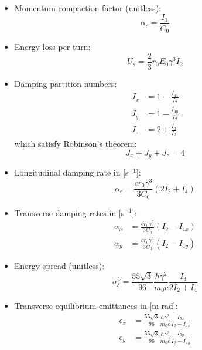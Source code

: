 \begin{itemize}
    \item Momentum compaction factor (unitless):
    \begin{equation}
        \alpha_c = \frac{I_1}{C_0}
    \end{equation}

    \item Energy loss per turn:
    \begin{equation}
        U_s = \frac{2}{3} r_0 E_0 \gamma^3 I_2
    \end{equation}

    \item Damping partition numbers:
    \begin{align}
        J_x &= 1 - \frac{I_{4x}}{I_2}\\
        J_y &= 1 - \frac{I_{4y}}{I_2}\\
        J_z &= 2 + \frac{I_4}{I_2}
    \end{align}
    which satisfy Robinson's theorem:
    \begin{equation}
        J_x + J_y + J_z = 4
    \end{equation}

    \item Longitudinal damping rate in [s$^{-1}$]:
    \begin{equation}
        \alpha_\epsilon = \frac{c r_0 \gamma^3}{3 C_0} (2I_2 + I_4)
    \end{equation}

    \item Transverse damping rates in [s$^{-1}$]:
    \begin{align}
        \alpha_x &= \frac{c r_0 \gamma^3}{3C_0} (I_2 - I_{4x})\\
        \alpha_y &= \frac{c r_0 \gamma^3}{3C_0} (I_2 - I_{4y})
    \end{align}

    \item Energy spread (unitless):
    \begin{equation}
        \sigma_\delta^2 = \frac{55 \sqrt{3}}{96} \frac{\hbar \gamma^2}{m_0 c} \frac{I_3}{2I_2 + I_4}
    \end{equation}

    \item Transverse equilibrium emittances in [m rad]:
    \begin{align}
        {\epsilon_x} &= \frac{55 \sqrt{3}}{96} \frac{\hbar \gamma^2}{m_0 c} \frac{I_{5x}}{I_2 - I_{4x}}\\
        {\epsilon_y} &= \frac{55 \sqrt{3}}{96} \frac{\hbar \gamma^2}{m_0 c} \frac{I_{5y}}{I_2 - I_{4y}}
    \end{align}


\end{itemize}

